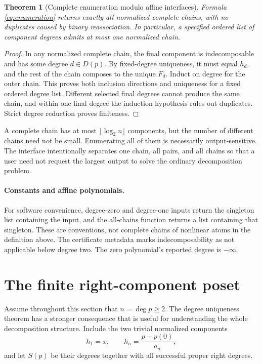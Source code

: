 \documentclass[11pt,a4paper]{article}
\numberwithin{equation}{section}
\newtheorem{theorem}{Theorem}[section]
\theoremstyle{definition}
\theoremstyle{remark}
\begin{document}
\begin{theorem}[Complete enumeration modulo affine interfaces]
\label{thm:enumeration}
Formula \eqref{eq:enumeration} returns exactly all normalized complete chains,
with no duplicates caused by binary reassociation. In particular, a specified
ordered list of component degrees admits at most one normalized chain.
\end{theorem}
\begin{proof}
In any normalized complete chain, the final component is indecomposable and
has some degree $d\in D(p)$. By fixed-degree uniqueness, it must equal $h_d$,
and the rest of the chain composes to the unique $F_d$. Induct on degree for
the outer chain. This proves both inclusion directions and uniqueness for a
fixed ordered degree list. Different selected final degrees cannot produce
the same chain, and within one final degree the induction hypothesis rules
out duplicates. Strict degree reduction proves finiteness.
\end{proof}

A complete chain has at most $\lfloor\log_2 n\rfloor$ components, but the
number of different chains need not be small. Enumerating all of them is
necessarily output-sensitive. The interface intentionally separates one
chain, all pairs, and all chains so that a user need not request the largest
output to solve the ordinary decomposition problem.

\paragraph{Constants and affine polynomials.}
For software convenience, degree-zero and degree-one inputs return the
singleton list containing the input, and the all-chains function returns a
list containing that singleton. These are conventions, not complete chains
of nonlinear atoms in the definition above. The certificate metadata marks
indecomposability as not applicable below degree two. The zero polynomial's
reported degree is $-\infty$.

\section{The finite right-component poset}\label{sec:poset}
Assume throughout this section that $n=\deg p\ge2$.
The degree uniqueness theorem has a stronger consequence that is useful for understanding the whole decomposition structure. Include the two trivial normalized components
\[
 h_1=x,\qquad h_n=\frac{p-p(0)}{a_n},
\]
and let $S(p)$ be their degrees together with all successful proper right degrees.
\end{document}
